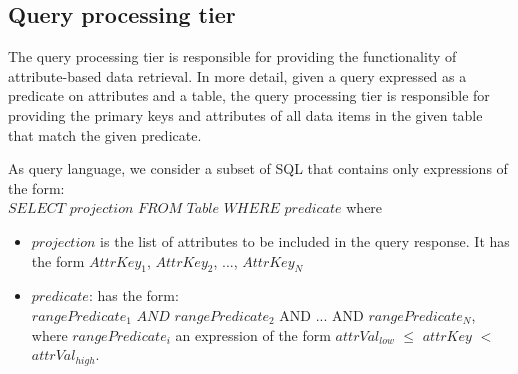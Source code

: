 

\subsection{Query processing tier}
The query processing tier is responsible for providing the functionality of attribute-based data retrieval.
In more detail, given a query expressed as a predicate on attributes and a table, the query processing tier is
responsible for providing the primary keys and attributes of all data items in the given table that match the given
predicate.

As query language, we consider a subset of SQL that contains only expressions of the form: \\

\noindent
$SELECT$ $projection$ $FROM$ $Table$ $WHERE$ $predicate$
\noindent
where
\begin{itemize}
  \item $projection$ is the list of attributes to be included in the query response.
  It has the form $AttrKey_1$, $AttrKey_2$, ..., $AttrKey_N$
  \item $predicate$: has the form: \\ $rangePredicate_1$ $AND$ $rangePredicate_2$ AND ... AND $rangePredicate_N$, \\
  where $rangePredicate_i$ an expression of the form $attrVal_{low}$ $\leq$ $attrKey$ $<$ $attrVal_{high}$.
\end{itemize}


